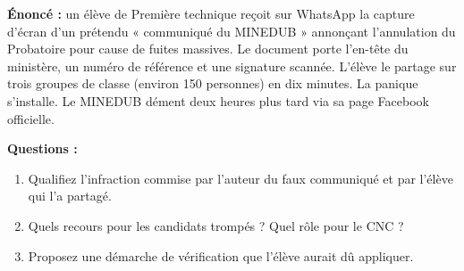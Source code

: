 \documentclass[11pt]{article}
\begin{document}
\begin{exoresolu}
\textbf{Énoncé :} un élève de Première technique reçoit sur WhatsApp la capture d'écran d'un prétendu « communiqué du MINEDUB » annonçant l'annulation du Probatoire pour cause de fuites massives. Le document porte l'en-tête du ministère, un numéro de référence et une signature scannée. L'élève le partage sur trois groupes de classe (environ 150 personnes) en dix minutes. La panique s'installe. Le MINEDUB dément deux heures plus tard via sa page Facebook officielle.

\textbf{Questions :}
\begin{enumerate}
    \item Qualifiez l'infraction commise par l'auteur du faux communiqué et par l'élève qui l'a partagé.
    \item Quels recours pour les candidats trompés ? Quel rôle pour le CNC ?
    \item Proposez une démarche de vérification que l'élève aurait dû appliquer.
\end{enumerate}


\end{exoresolu}
\end{document}
